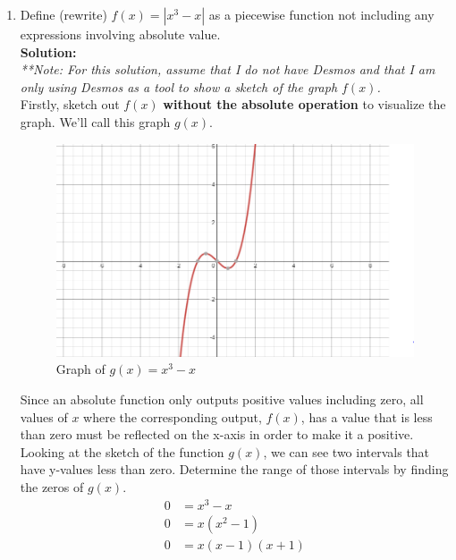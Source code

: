 \documentclass[12pt]{book}
\begin{document}
\begin{enumerate}
\newpage

\item Define (rewrite) $f(x) = |x^3 - x|$ as a piecewise function not including any expressions involving absolute value.\\

\textbf{Solution:}\\
\textit{**Note: For this solution, assume that I do not have Desmos and that I am only using Desmos as a tool to show a sketch of the graph $f(x)$.}\\

Firstly, sketch out $f(x)$ \textbf{without the absolute operation} to visualize the graph. We'll call this graph $g(x)$.

\begin{figure}[h]
\centering
\includegraphics[width=1\textwidth]{Q8Graph.png}
\caption{Graph of $g(x) = x^3 - x$}
\end{figure}

Since an absolute function only outputs positive values including zero, all values of $x$ where the corresponding output, $f(x)$, has a value that is less than zero must be reflected on the x-axis in order to make it a positive. Looking at the sketch of the function $g(x)$, we can see two intervals that have y-values less than zero. Determine the range of those intervals by finding the zeros of $g(x)$.
\setcounter{equation}{0}
\begin{align}
    0 &= x^3 - x\\
    0 &= x(x^2 - 1)\\
    0 &= x(x-1)(x+1)
\end{align}


\end{enumerate}
\end{document}
